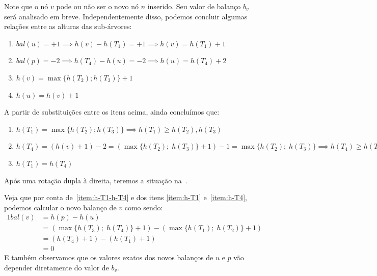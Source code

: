 \documentclass[11pt,twoside]{article}
\theoremstyle{definition}
\begin{document}
Note que o nó \( v \) pode ou não ser o novo nó \( n \) inserido. Seu valor de balanço \( b_v \) será analisado em breve. Independentemente disso, podemos concluir algumas relações entre as alturas das sub-árvores:
\begin{enumerate}[label={\Roman*.}, series=alturas-duplas]
	\item \label{item:h-v-h-T1} \( bal(u) = +1 \implies h(v) - h(T_1) = +1 \implies h(v) = h(T_1) + 1 \)
	\item \label{item:h-u-h-T4} \( bal(p) = -2 \implies h(T_4) - h(u) = -2 \implies h(u) = h(T_4) + 2 \)
	\item \label{item:h-v} \( h(v) = \max \{ h(T_2); h(T_3) \} + 1 \)
	\item \label{item:h-u-h-v} \( h(u) = h(v) + 1 \)
\end{enumerate}

A partir de substituições entre os itens acima, ainda concluímos que:
\begin{enumerate}[label={\Roman*.}, resume=alturas-duplas]
	\item \label{item:h-T1}\( h(T_1) = \max \{ h(T_2); h(T_3) \} \implies h(T_1) \geq h(T_2), h(T_3) \)
	\item \label{item:h-T4}\( h(T_4) = (h(v) + 1) - 2 = (\max \{ h(T_2);\; h(T_3) \} + 1) - 1 = \max \{ h(T_2);\; h(T_3) \} \implies h(T_4) \geq h(T_2), h(T_3) \)
	\item \label{item:h-T1-h-T4}\( h(T_1) = h(T_4) \)
\end{enumerate}

Após uma rotação dupla à direita, teremos a situação na~.
\begin{figure}[hbt]
	\caption{\label{fig:ins-rot-dupla-dir-post}}
	\centering
	
\end{figure}
Veja que por conta de~\ref{item:h-T1-h-T4} e dos itens \ref{item:h-T1} e~\ref{item:h-T4}, podemos calcular o novo balanço de \( v \) como sendo:
\begin{alignat*}{1}
	bal(v) & = h(p) - h(u)                                                                                     \\
	       & = \left( \max \{ h(T_3);\; h(T_4) \} + 1 \right) - \left( \max \{ h(T_1);\; h(T_2) \} + 1 \right) \\
	       & = (h(T_4) + 1) - (h(T_1) + 1)                                                                     \\
	       & = 0
\end{alignat*}
E também observamos que os valores exatos dos novos balanços de \( u \) e \( p \) vão depender diretamente do valor de \( b_v \).
\end{document}
